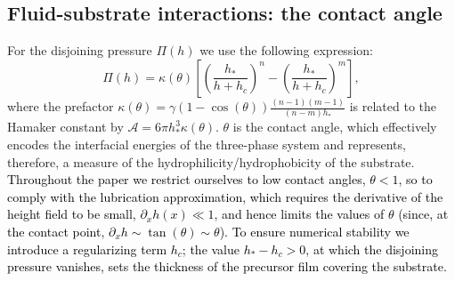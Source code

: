 \subsection{Fluid-substrate interactions: the contact angle}\label{subsec:fluid_substrate}
For the disjoining pressure $\Pi(h)$ we use the following 
expression\textcolor{black}{\cite{RevModPhys.81.1131, Peschka9275, PhysRevE.92.061002, RevModPhys.69.931}}:
\begin{equation}\label{eq:disjoin_p}
    \Pi(h) = \kappa(\theta) \left[\left(\frac{h_{\ast}}{h+h_c}\right)^n - \left(\frac{h_{\ast}}{h+h_c}\right)^m\right],
\end{equation}
where the prefactor $\kappa(\theta) = \gamma(1-\cos(\theta))\frac{(n-1)(m-1)}{(n-m)h_{\ast}}$ is related to the Hamaker constant by
$\mathcal{A} = 6 \pi h_{\ast}^3 \kappa(\theta)$.
$\theta$ is the contact angle, which effectively encodes the interfacial energies of the three-phase system and represents, therefore, a measure of the hydrophilicity/hydrophobicity of the substrate.
\textcolor{black}{Throughout the paper we restrict ourselves to low contact angles, $\theta < 1$,
so to comply with the lubrication approximation, which requires the derivative of the height field to be small, $\partial_x h(x) \ll 1$, and hence limits
the values of $\theta$ (since, at the contact point, $\partial_x h \sim \tan(\theta) \sim \theta$).}
\textcolor{black}{To ensure numerical stability we introduce a regularizing term $h_c$; the value $h_{\ast} - h_c > 0$, 
at which the disjoining pressure vanishes, sets the thickness of the precursor film covering the substrate.}

